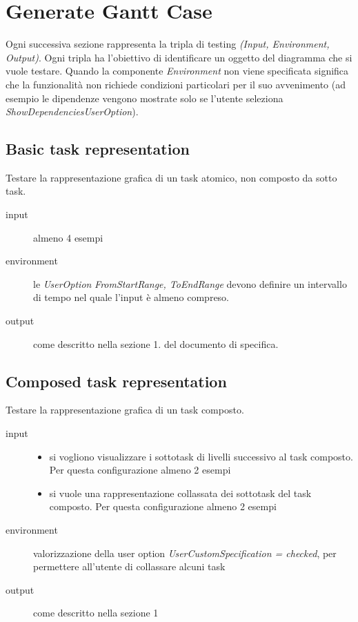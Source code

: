 \chapter{Generate Gantt Case}
\label{chap:generateGantt}

Ogni successiva sezione rappresenta la tripla di testing \emph{(Input,
Environment, Output)}. Ogni tripla ha l'obiettivo di identificare un oggetto del
diagramma che si vuole testare. Quando la componente \emph{Environment} non
viene specificata significa che la funzionalit\`a non richiede condizioni
particolari per il suo avvenimento (ad esempio le dipendenze vengono mostrate
solo se l'utente seleziona \emph{ShowDependenciesUserOption}).

\section{Basic task representation}
Testare la rappresentazione grafica di un task atomico, non composto da sotto
task.
\begin{description}
\item[input] almeno 4 esempi
\item[environment] le \emph{UserOption} \emph{FromStartRange, ToEndRange}
devono definire un intervallo di tempo nel quale l'input \`e almeno compreso.
\item[output] come descritto nella sezione 1. del
documento di specifica.
\end{description}

\section{Composed task representation}
Testare la rappresentazione grafica di un task composto.
\begin{description}
\item[input] 
\quad
\begin{itemize}
  \item si vogliono visualizzare i sottotask di livelli successivo al task
  composto. Per questa configurazione almeno 2 esempi
  \item si vuole una rappresentazione collassata dei sottotask del task
  composto. Per questa configurazione almeno 2 esempi
\end{itemize}
\item[environment] valorizzazione della user option
\emph{UserCustomSpecification = checked}, per permettere all'utente di
collassare alcuni task
\item[output] come descritto nella sezione 1
\end{description}

